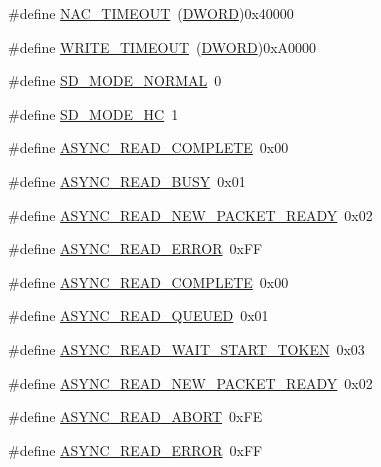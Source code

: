 \begin{DoxyCompactItemize}
\item 
\#define \hyperlink{_s_d-_s_p_i_8h_a4bf850ae6627d415837256d1fc06c4e7}{N\+A\+C\+\_\+\+T\+I\+M\+E\+O\+U\+T}~(\hyperlink{_generic_type_defs_8h_ad342ac907eb044443153a22f964bf0af}{D\+W\+O\+R\+D})0x40000
\item 
\#define \hyperlink{_s_d-_s_p_i_8h_a3af75bd8417b347229705d6d522ad5c3}{W\+R\+I\+T\+E\+\_\+\+T\+I\+M\+E\+O\+U\+T}~(\hyperlink{_generic_type_defs_8h_ad342ac907eb044443153a22f964bf0af}{D\+W\+O\+R\+D})0x\+A0000
\item 
\#define \hyperlink{_s_d-_s_p_i_8h_a41bcab610df08c3f48e5bea0b7aa4be9}{S\+D\+\_\+\+M\+O\+D\+E\+\_\+\+N\+O\+R\+M\+A\+L}~0
\item 
\#define \hyperlink{_s_d-_s_p_i_8h_a768198433cac11ed5aa1e9dde59e3586}{S\+D\+\_\+\+M\+O\+D\+E\+\_\+\+H\+C}~1
\item 
\#define \hyperlink{_s_d-_s_p_i_8h_ad224ce286fbe2a2f2c89693c3db94372}{A\+S\+Y\+N\+C\+\_\+\+R\+E\+A\+D\+\_\+\+C\+O\+M\+P\+L\+E\+T\+E}~0x00
\item 
\#define \hyperlink{_s_d-_s_p_i_8h_a56aa0c31ca1851292de52c023359f887}{A\+S\+Y\+N\+C\+\_\+\+R\+E\+A\+D\+\_\+\+B\+U\+S\+Y}~0x01
\item 
\#define \hyperlink{_s_d-_s_p_i_8h_a320c1139dec5a480e358344d685b4d05}{A\+S\+Y\+N\+C\+\_\+\+R\+E\+A\+D\+\_\+\+N\+E\+W\+\_\+\+P\+A\+C\+K\+E\+T\+\_\+\+R\+E\+A\+D\+Y}~0x02
\item 
\#define \hyperlink{_s_d-_s_p_i_8h_a1cd74b9827eb380e8638fe778471b3f1}{A\+S\+Y\+N\+C\+\_\+\+R\+E\+A\+D\+\_\+\+E\+R\+R\+O\+R}~0x\+F\+F
\item 
\#define \hyperlink{_s_d-_s_p_i_8h_ad224ce286fbe2a2f2c89693c3db94372}{A\+S\+Y\+N\+C\+\_\+\+R\+E\+A\+D\+\_\+\+C\+O\+M\+P\+L\+E\+T\+E}~0x00
\item 
\#define \hyperlink{_s_d-_s_p_i_8h_ad3bcf67c158c8afa2aa8ad467f111c5e}{A\+S\+Y\+N\+C\+\_\+\+R\+E\+A\+D\+\_\+\+Q\+U\+E\+U\+E\+D}~0x01
\item 
\#define \hyperlink{_s_d-_s_p_i_8h_a4a15e9d991fcf3863e792d0b7a982f3d}{A\+S\+Y\+N\+C\+\_\+\+R\+E\+A\+D\+\_\+\+W\+A\+I\+T\+\_\+\+S\+T\+A\+R\+T\+\_\+\+T\+O\+K\+E\+N}~0x03
\item 
\#define \hyperlink{_s_d-_s_p_i_8h_a320c1139dec5a480e358344d685b4d05}{A\+S\+Y\+N\+C\+\_\+\+R\+E\+A\+D\+\_\+\+N\+E\+W\+\_\+\+P\+A\+C\+K\+E\+T\+\_\+\+R\+E\+A\+D\+Y}~0x02
\item 
\#define \hyperlink{_s_d-_s_p_i_8h_a685aa61458c505ded19bf16ff0f82e59}{A\+S\+Y\+N\+C\+\_\+\+R\+E\+A\+D\+\_\+\+A\+B\+O\+R\+T}~0x\+F\+E
\item 
\#define \hyperlink{_s_d-_s_p_i_8h_a1cd74b9827eb380e8638fe778471b3f1}{A\+S\+Y\+N\+C\+\_\+\+R\+E\+A\+D\+\_\+\+E\+R\+R\+O\+R}~0x\+F\+F

\end{DoxyCompactItemize}
